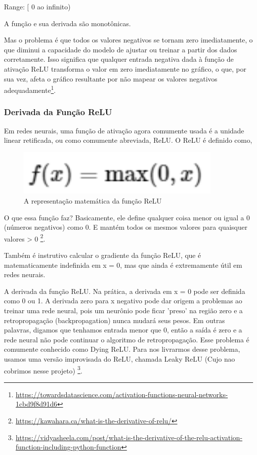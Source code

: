 Range: [ 0 ao infinito)

A função e sua derivada são monotônicas.

Mas o problema é que todos os valores negativos se tornam zero imediatamente, o que diminui a capacidade do modelo de ajustar ou treinar a partir dos dados corretamente. Isso significa que qualquer entrada negativa dada à função de ativação ReLU transforma o valor em zero imediatamente no gráfico, o que, por sua vez, afeta o gráfico resultante por não mapear os valores negativos adequadamente\footnote{\url{https://towardsdatascience.com/activation-functions-neural-networks-1cbd9f8d91d6}}.

\subsubsection[Derivada da Função ReLU]{Derivada da Função ReLU}

Em redes neurais, uma função de ativação agora comumente usada é a unidade linear retificada, ou como comumente abreviada, ReLU. O ReLU é definido como,

\begin{figure}[H]
   \begin{center}
      \includegraphics[width=10cm]{img/relu2.png}
      \caption{A representação matemática da função ReLU} \label{relu2}
   \end{center}
\end{figure}

O que essa função faz? Basicamente, ele define qualquer coisa menor ou igual a 0 (números negativos) como 0. E mantém todos os mesmos valores para quaisquer valores > 0 \footnote{\url{https://kawahara.ca/what-is-the-derivative-of-relu/}}.

Também é instrutivo calcular o gradiente da função ReLU, que é matematicamente indefinida em x = 0, mas que ainda é extremamente útil em redes neurais.

A derivada da função ReLU. Na prática, a derivada em x = 0 pode ser definida como 0 ou 1.
A derivada zero para x negativo pode dar origem a problemas ao treinar uma rede neural,
pois um neurônio pode ficar 'preso' na região zero e a retropropagação (backpropagation) nunca mudará seus pesos.
Em outras palavras, digamos que tenhamos entrada menor que 0, então a saída é zero e a rede neural não pode continuar o algoritmo de retropropagação. Esse problema é comumente conhecido como Dying ReLU. Para nos livrarmos desse problema, usamos uma versão improvisada do ReLU, chamada Leaky ReLU (Cujo nao cobrimos nesse projeto) \footnote{\url{https://vidyasheela.com/post/what-is-the-derivative-of-the-relu-activation-function-including-python-function}}.

